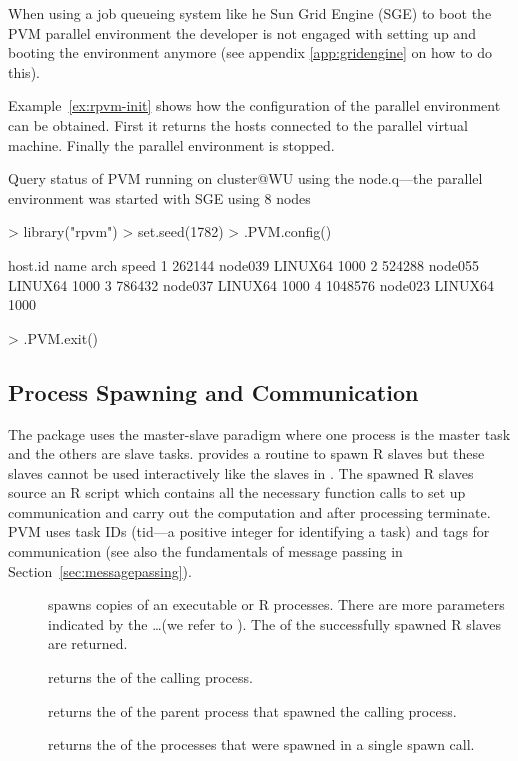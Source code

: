 When using a job queueing system like he Sun Grid Engine (SGE) to boot
the PVM parallel environment the developer is not engaged with
setting up and booting the environment anymore (see
appendix \ref{app:gridengine} on how to do this).

Example~\ref{ex:rpvm-init} shows how the configuration of the parallel
environment can be obtained. First it returns the hosts connected to
the parallel virtual machine. Finally the
parallel environment is stopped. 

\begin{Example} Query status of PVM \newline
running on cluster@WU using the node.q---the parallel environment was
started with SGE using 8 nodes

\begin{Schunk}
\begin{Sinput}
> library("rpvm")
> set.seed(1782)
> .PVM.config()
\end{Sinput}
\begin{Soutput}
  host.id    name    arch speed
1  262144 node039 LINUX64  1000
2  524288 node055 LINUX64  1000
3  786432 node037 LINUX64  1000
4 1048576 node023 LINUX64  1000
\end{Soutput}
\begin{Sinput}
> .PVM.exit()
\end{Sinput}
\end{Schunk}
\label{ex:rpvminit}
\end{Example}

\subsection{Process Spawning and Communication}

The package  uses the master-slave paradigm where one
process is the master task and the others are slave tasks. 
provides a routine to spawn R slaves but these slaves cannot be used
interactively like the slaves in . The spawned R slaves
source an R script which contains all the necessary function calls to
set up communication and carry out the computation and after
processing terminate.
PVM uses task IDs (tid---a positive integer for identifying a task)
and tags for communication (see
also the fundamentals of message passing in
Section~\ref{sec:messagepassing}).

\begin{description}
\item[] spawns 
  copies 
  of an executable or  R processes. There are more
  parameters indicated by the \ldots (we refer to
  \cite{nali07rpvm}). The  of the successfully spawned R
  slaves are returned.
\item[] returns the  of the calling
  process.
\item[] returns the  of the parent
  process that spawned the calling process.
\item[] returns the  of the processes
  that were spawned in a single spawn call.
\end{description}

